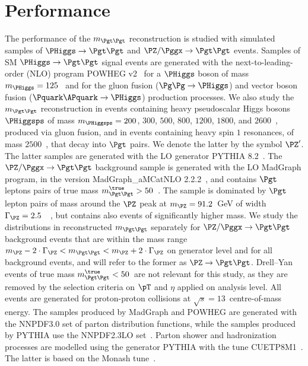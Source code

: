 \section{Performance}
\label{sec:performance}

The performance of the $m_{\Pgt\Pgt}$ reconstruction is studied with
simulated samples of $\PHiggs \to \Pgt\Pgt$ and $\PZ/\Pggx \to \Pgt\Pgt$ events.
Samples of SM $\PHiggs \to \Pgt\Pgt$ signal events
are generated with the next-to-leading-order (NLO) program POWHEG v2~\cite{POWHEG1,POWHEG2,POWHEG3}
for a $\PHiggs$ boson of mass $m_{\PHiggs} = 125$~\GeV 
and for the gluon fusion ($\Pg\Pg \to \PHiggs$) and vector boson fusion ($\Pquark\APquark \to \PHiggs$) production processes.
We also study the $m_{\Pgt\Pgt}$ reconstruction in events containing
heavy pseudoscalar Higgs bosons $\PHiggsps$ of mass $m_{\PHiggsps} = 200$, $300$, $500$, $800$, $1200$, $1800$, and $2600$~\GeV,
produced via gluon fusion, and in events containing heavy spin $1$
resonances, of mass $2500$~\GeV, that decay into $\Pgt$ pairs.
We denote the latter by the symbol $\PZ'$. 
The latter samples are generated with the LO generator PYTHIA 8.2~\cite{pythia8}.
The $\PZ/\Pggx \to \Pgt\Pgt$ background sample is generated with the LO MadGraph program, in the version MadGraph\_aMCatNLO 2.2.2~\cite{MadGraph_aMCatNLO},
and contains $\Pgt$ leptons pairs of true mass $m_{\Pgt\Pgt}^{\true} > 50$~\GeV.
The sample is dominated by $\Pgt$ lepton pairs of mass around the $\PZ$ peak at $m_{\PZ} = 91.2$~GeV of width $\Gamma_{\PZ} = 2.5$~\GeV~\cite{PDG}, 
but contains also events of significantly higher mass.
We study the distributions in reconstructed $m_{\Pgt\Pgt}$ separately for 
$\PZ/\Pggx \to \Pgt\Pgt$ background events that are within the mass range $m_{\PZ} - 2 \cdot \Gamma_{\PZ} < m_{\Pgt\Pgt} < m_{\PZ} + 2 \cdot \Gamma_{\PZ}$ on generator level
and for all background events,
and will refer to the former as $\PZ \to \Pgt\Pgt$.
Drell--Yan events of true mass $m_{\Pgt\Pgt}^{\true} < 50$~\GeV are not relevant for this study, 
as they are removed by the selection criteria on $\pT$ and $\eta$ applied on analysis level.
All events are generated for proton-proton collisions at $\sqrt{s} = 13$~\TeV centre-of-mass energy.
The samples produced by MadGraph and POWHEG are generated with the NNPDF3.0 set of parton distribution functions,
while the samples produced by PYTHIA use the NNPDF2.3LO set~\cite{NNPDF1,NNPDF2,NNPDF3}.
Parton shower and hadronization processes are modelled using the generator PYTHIA with the tune CUETP8M1~\cite{PYTHIA_CUETP8M1tune_CMS}.
The latter is based on the Monash tune~\cite{PYTHIA_MonashTune}.
